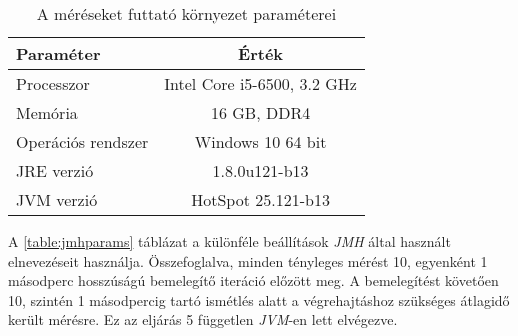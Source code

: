 \begin{table}[h]
\captionsetup{justification=centering}
\centering
  \begin{tabular}{|| l | c ||}
  \hline
  Paraméter & Érték \\
  \hline \hline
  Processzor                  & Intel Core i5-6500, 3.2 GHz \\
  Memória                     & 16 GB, DDR4 \\
  \hline
  Operációs rendszer                        & Windows 10 64 bit \\
  \hline
  JRE verzió                  & 1.8.0u121-b13 \\
  JVM verzió                  & HotSpot 25.121-b13 \\
  \hline
  \end{tabular}
\caption{A méréseket futtató környezet paraméterei}  
\label{table:envparams}
\end{table}

A \ref{table:jmhparams} táblázat a különféle beállítások \textit{JMH} által használt elnevezéseit használja. Összefoglalva, minden tényleges mérést 10, egyenként 1 másodperc hosszúságú bemelegítő iteráció előzött meg. A bemelegítést követően 10, szintén 1 másodpercig tartó ismétlés alatt a végrehajtáshoz szükséges átlagidő került mérésre. Ez az eljárás 5 független \textit{JVM}-en lett elvégezve.
